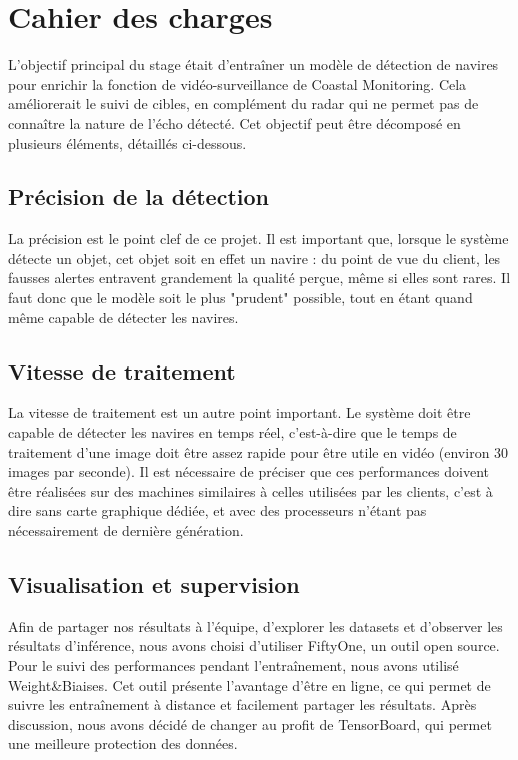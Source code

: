 \chapter{Cahier des charges}

L'objectif principal du stage était d'entraîner un modèle de détection
de navires pour enrichir la fonction de vidéo-surveillance de Coastal Monitoring.
Cela améliorerait le suivi de cibles, en complément du radar qui ne permet 
pas de connaître la nature de l'écho détecté.
Cet objectif peut être décomposé en plusieurs éléments, détaillés ci-dessous.

\section{Précision de la détection}

La précision est le point clef de ce projet. Il est important que, lorsque le
système détecte un objet, cet objet soit en effet un navire : du point de vue du client,
les fausses alertes entravent grandement la qualité perçue, même si elles sont rares.
Il faut donc que le modèle soit le plus "prudent" possible, tout en étant quand même
capable de détecter les navires.

\section{Vitesse de traitement}

La vitesse de traitement est un autre point important. Le système doit être capable
de détecter les navires en temps réel, c'est-à-dire que le temps de traitement d'une image
doit être assez rapide pour être utile en vidéo (environ 30 images par seconde).
Il est nécessaire de préciser que ces performances doivent être réalisées sur
des machines similaires à celles utilisées par les clients, c'est à dire sans
carte graphique dédiée, et avec des processeurs n'étant pas nécessairement de
dernière génération.

\section{Visualisation et supervision}

Afin de partager nos résultats à l'équipe, d'explorer les datasets et d'observer les résultats
d'inférence, nous avons choisi d'utiliser FiftyOne, un outil open source.\\ 

Pour le suivi des performances pendant l'entraînement, nous avons utilisé Weight\&Biaises. 
Cet outil présente l'avantage d'être en ligne, ce qui permet de suivre les entraînement 
à distance et facilement partager les résultats. Après discussion, nous avons décidé de 
changer au profit de TensorBoard, qui permet une meilleure protection des données.

